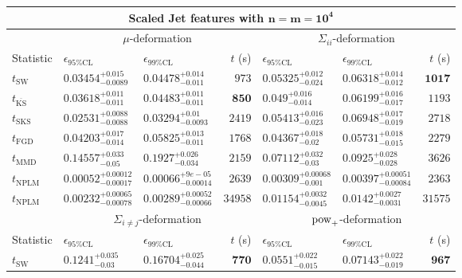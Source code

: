 \begin{tabular}{l|llr|llr}
	\toprule
	\multicolumn{7}{c}{{\bf Scaled Jet features with $\mathbf{n=m=10^{4}}$}} \\
	\toprule
	\multicolumn{1}{c}{} & \multicolumn{3}{c}{$\mu$-deformation} & \multicolumn{3}{c}{$\Sigma_{ii}$-deformation} \\
	Statistic & $\epsilon_{95\%\mathrm{CL}}$ & $\epsilon_{99\%\mathrm    {CL}}$ & $t$ (s) & $\epsilon_{95\%\mathrm{CL}}$ & $\epsilon_{99\%\mathrm{CL}}$ & $t$ (s) \\
	\midrule
	$t_{\mathrm{SW}}$ & $0.03454_{-0.0089}^{+0.015}$ & $0.04478_{-0.011}^{+0.014}$ & $973$ & $0.05325_{-0.024}^{+0.012}$ & $0.06318_{-0.012}^{+0.014}$ & ${\mathbf{1017}}$ \\
	$t_{\overline{\mathrm{KS}}}$ & $0.03618_{-0.011}^{+0.011}$ & $0.04483_{-0.011}^{+0.011}$ & ${\mathbf{850}}$ & $0.049_{-0.014}^{+0.016}$ & $0.06199_{-0.017}^{+0.016}$ & $1193$ \\
	$t_{\mathrm{SKS}}$ & ${\mathbf{0.02531_{-0.0088}^{+0.0088}}}$ & ${\mathbf{0.03294_{-0.0093}^{+0.01}}}$ & $2419$ & $0.05413_{-0.023}^{+0.016}$ & $0.06948_{-0.019}^{+0.017}$ & $2718$ \\
	$t_{\mathrm{FGD}}$ & $0.04203_{-0.014}^{+0.017}$ & $0.05825_{-0.011}^{+0.013}$ & $1768$ & ${\mathbf{0.04367_{-0.02}^{+0.018}}}$ & ${\mathbf{0.05731_{-0.015}^{+0.018}}}$ & $2279$ \\
	$t_{\mathrm{MMD}}$ & $0.14557_{-0.05}^{+0.033}$ & $0.1927_{-0.034}^{+0.026}$ & $2159$ & $0.07112_{-0.03}^{+0.032}$ & $0.0925_{-0.028}^{+0.028}$ & $3626$ \\
\rowcolor{red!35}	$t_{\mathrm{NPLM}}$ & $0.00052_{-0.00017}^{+0.00012}$ & $0.00066_{-0.00014}^{+9e-05}$ & $2639$ & $0.00309_{-0.001}^{+0.00068}$ & $0.00397_{-0.00084}^{+0.00051}$ & $2363$ \\
\rowcolor{blue!35}	$t_{\mathrm{NPLM}}$ & $0.00232_{-0.00078}^{+0.00065}$ & $0.00289_{-0.00066}^{+0.00052}$ & $34958$ & $0.01154_{-0.0045}^{+0.0032}$ & $0.0142_{-0.0031}^{+0.0027}$ & $31575$ \\
	\toprule
	\multicolumn{1}{c}{} & \multicolumn{3}{c}{$\Sigma_{i\neq j}$-deformation} & \multicolumn{3}{c}{$\rm{pow}_{+}$-deformation} \\
Statistic & $\epsilon_{95\%\mathrm{CL}}$ & $\epsilon_{99\%\mathrm{CL}}$ & $t$ (s) & $\epsilon_{95\%\mathrm{CL}}$ & $\epsilon_{99\%\mathrm{CL}}$ & $t$ (s) \\
	\midrule
	$t_{\mathrm{SW}}$ & $0.1241_{-0.03}^{+0.035}$ & $0.16704_{-0.044}^{+0.025}$ & ${\mathbf{770}}$ & $0.0551_{-0.015}^{+0.022}$ & $0.07143_{-0.019}^{+0.022}$ & ${\mathbf{967}}$ \\

\end{tabular}
